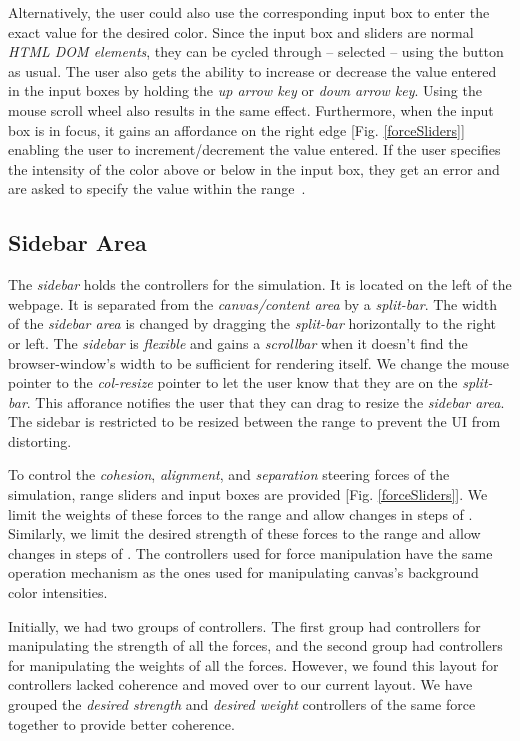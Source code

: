\documentclass[../main]{subfiles}
\begin{document}
Alternatively, the user could also use the corresponding input box to enter the exact value for the desired color. Since the input box and sliders are normal {\em HTML DOM elements}, they can be cycled through -- selected -- using the  button as usual. The user also gets the ability to increase or decrease the value entered in the input boxes by holding the {\em up arrow key} or {\em down arrow key}. Using the mouse scroll wheel also results in the same effect. Furthermore, when the input box is in focus, it gains an affordance on the right edge [Fig. \ref{forceSliders}]  enabling the user to increment/decrement the value entered. If the user specifies the intensity of the color above  or below  in the input box, they get an error and are asked to specify the value within the range~.

\subsection{Sidebar Area}
\label{sidebarArea}

The {\em sidebar} holds the controllers for the simulation. It is located on the left of the webpage. It is separated from the {\em canvas/content area} by a {\em split-bar}. The width of the {\em sidebar area} is changed by dragging the {\em split-bar} horizontally to the right or left. The {\em sidebar} is {\em flexible} and gains a {\em scrollbar} when it doesn't find the browser-window's width to be sufficient for rendering itself. We change the mouse pointer to the \mbox{\em col-resize} pointer to let the user know that they are on the {\em split-bar}. This afforance notifies the user that they can drag to resize the {\em sidebar area}. The sidebar is restricted to be resized between the range  to prevent the UI from distorting.

To control the {\em cohesion}, {\em alignment}, and {\em separation} steering forces of the simulation, range sliders and input boxes are provided [Fig. \ref{forceSliders}]. We limit the weights of these forces to the range  and allow changes in steps of . Similarly, we limit the desired strength of these forces to the range  and allow changes in steps of . The controllers used for force manipulation have the same operation mechanism as the ones used for manipulating canvas's background color intensities.

Initially, we had two groups of controllers. The first group had controllers for manipulating the strength of all the forces, and the second group had controllers for manipulating the weights of all the forces. However, we found this layout for controllers lacked coherence and moved over to our current layout. We have grouped the {\em desired strength} and {\em desired weight} controllers of the same force together to provide better coherence.
\end{document}
